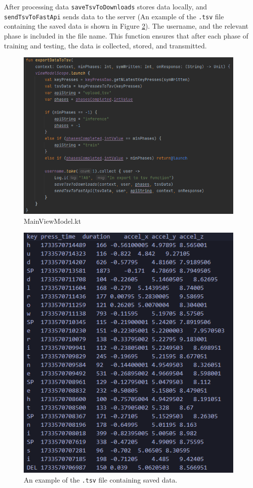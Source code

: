 After processing data \texttt{saveTsvToDownloads} stores data locally, and \texttt{sendTsvToFastApi} sends data to the server (An example of the \texttt{.tsv} file containing the saved data is shown in Figure \ref{fig:tsv_example}). The username, and the relevant phase is included in the file name. \newline
This function ensures that after each phase of training and testing, the data is collected, stored, and transmitted.

\begin{figure}[H]
	\centering
	\includegraphics[width=0.8\linewidth]{images/ExportData.png}
	\caption{MainViewModel.kt}
	\label{fig:export_data_code}
\end{figure}

\begin{figure}[H]
	\centering
	\includegraphics[width=0.8\linewidth]{images/data_example.png}
	\caption{An example of the \texttt{.tsv} file containing saved data.}
	\label{fig:tsv_example}
\end{figure}

